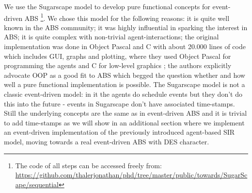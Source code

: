 We use the Sugarscape model to develop pure functional concepts for event-driven ABS \footnote{The code of all steps can be accessed freely from: \url{https://github.com/thalerjonathan/phd/tree/master/public/towards/SugarScape/sequential}}. We chose this model for the following reasons: it is quite well known in the ABS community; it was highly influential in sparking the interest in ABS; it is quite complex with non-trivial agent-interactions; the original implementation was done in Object Pascal and C with about 20.000 lines of code which includes GUI, graphs and plotting, where they used Object Pascal for programming the agents and C for low-level graphics \cite{axtell_aligning_1996}; the authors explicitly advocate OOP as a good fit to ABS which begged the question whether and how well a pure functional implementation is possible. The Sugarscape model is not a classic event-driven model: in it the agents do schedule events but they don't do this into the future - events in Sugarscape don't have associated time-stamps. Still the underlying concepts are the same as in event-driven ABS and it is trivial to add time-stamps as we will show in an additional section where we implement an event-driven implementation of the previously introduced agent-based SIR model, moving towards a real event-driven ABS with DES character.







